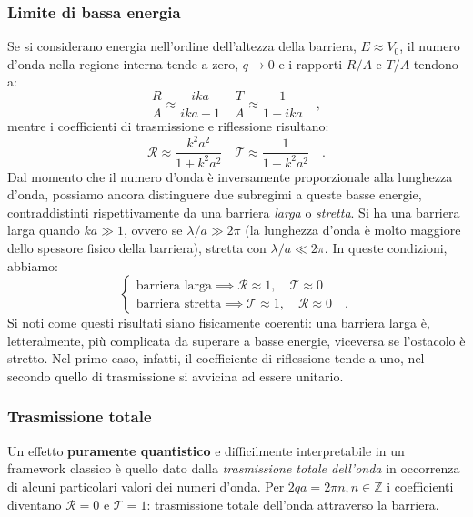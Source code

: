 \subsubsection{Limite di bassa energia}
Se si considerano energia nell'ordine dell'altezza della barriera, $E \approx V_0$, il numero d'onda nella regione interna tende a zero, $q \to 0$ e i rapporti $R/A$ e $T/A$ tendono a:
\[
    \frac{R}{A} \approx \frac{ika}{ika - 1} \quad \frac{T}{A} \approx \frac{1}{1-ika} \quad,
\] 
mentre i coefficienti di trasmissione e riflessione risultano:
\[
    \mathcal{R} \approx \frac{k^2a^2}{1+k^2a^2} \quad \mathcal{T} \approx \frac{1}{1+k^2a^2} \quad.
\]  
Dal momento che il numero d'onda è inversamente proporzionale alla lunghezza d'onda, possiamo ancora distinguere due subregimi a queste basse energie, contraddistinti rispettivamente da una barriera \emph{larga} o \emph{stretta}. Si ha una barriera larga quando $ka \gg 1$, ovvero se $\lambda / a \gg 2\pi$ (la lunghezza d'onda è molto maggiore dello spessore fisico della barriera), stretta con $\lambda / a \ll 2\pi$. In queste condizioni, abbiamo:
\[
    \begin{cases}
    \text{barriera larga} \implies \mathcal{R} \approx 1, \quad \mathcal{T} \approx 0 \\
    \text{barriera stretta} \implies \mathcal{T} \approx 1, \quad \mathcal{R} \approx 0 \quad.
    \end{cases}
\]
Si noti come questi risultati siano fisicamente coerenti: una barriera larga è, letteralmente, più complicata da superare a basse energie, viceversa se l'ostacolo è stretto. Nel primo caso, infatti, il coefficiente di riflessione tende a uno, nel secondo quello di trasmissione si avvicina ad essere unitario.

\subsubsection{Trasmissione totale}
Un effetto \textbf{puramente quantistico} e difficilmente interpretabile in un framework classico è quello dato dalla \emph{trasmissione totale dell'onda} in occorrenza di alcuni particolari valori dei numeri d'onda. Per $2qa = 2\pi n, n \in \mathbb{Z}$ i coefficienti diventano $\mathcal{R} = 0$ e $\mathcal{T} = 1$: trasmissione totale dell'onda attraverso la barriera.

